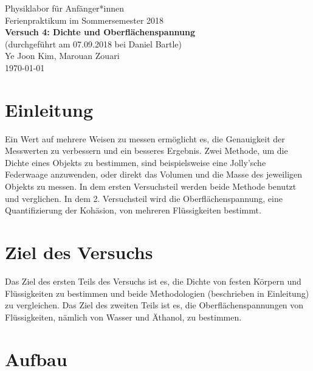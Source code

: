 \documentclass[11pt,a4paper]{article} %
\begin{document}
{
	\centering 
	\large 
	Physiklabor für Anfänger*innen \\
	Ferienpraktikum im Sommersemester 2018 \\[4mm]
	\textbf{\LARGE 
		Versuch 4: Dichte und Oberflächenspannung
	} \\[3mm]
	(durchgeführt am 07.09.2018 bei Daniel Bartle) \\
	Ye Joon Kim, Marouan Zouari\\
	\today \\[10mm]
}


\section{Einleitung}
Ein Wert auf mehrere Weisen zu messen ermöglicht es, die Genauigkeit der Messwerten zu verbessern und ein besseres Ergebnis. Zwei Methode, um die Dichte eines Objekts zu bestimmen, sind beispielsweise eine Jolly'sche Federwaage anzuwenden, oder direkt das Volumen und die Masse des jeweiligen Objekts zu messen. In dem ersten Versuchsteil werden beide Methode benutzt und verglichen. In dem 2. Versuchsteil wird die Oberflächenspannung, eine Quantifizierung der Kohäsion, von mehreren Flüssigkeiten bestimmt. 
\section{Ziel des Versuchs}
Das Ziel des ersten Teils des Versuchs ist es, die Dichte von festen Körpern und Flüssigkeiten zu bestimmen und beide Methodologien (beschrieben in Einleitung) zu vergleichen. Das Ziel des zweiten Teils ist es, die Oberflächenspannungen von Flüssigkeiten, nämlich von Wasser und Äthanol, zu bestimmen. 

\section{Aufbau}
\end{document}
